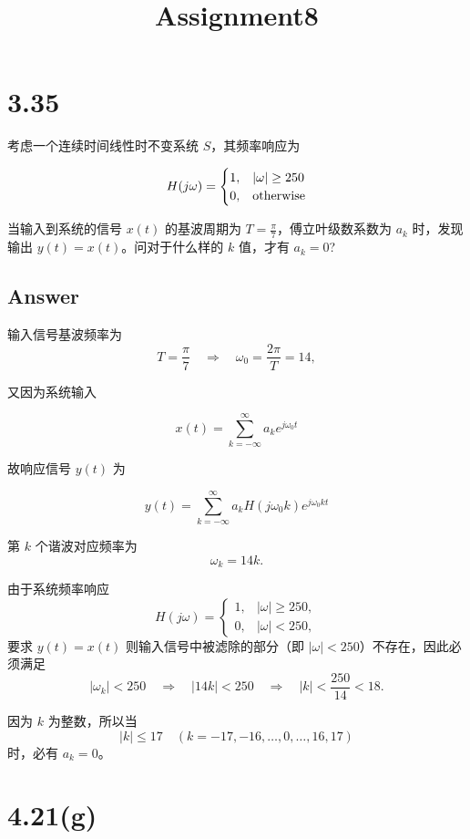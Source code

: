 \documentclass[11pt]{article}
\title{Assignment8}
\begin{document}
    
    \maketitle
    
    

    
    \section{3.35}\label{section}

考虑一个连续时间线性时不变系统 \(S\)，其频率响应为

\[
H(j\omega) = \begin{cases}
1, & |\omega| \ge 250 \\
0, & \rm otherwise
\end{cases}
\]

当输入到系统的信号 \(x(t)\) 的基波周期为 \(T = \frac{\pi}{7}
\)，傅立叶级数系数为 \(a_k\) 时，发现输出
\(y(t) = x(t)\)。问对于什么样的 \(k\) 值，才有 \(a_k = 0\)?

\subsection{Answer}\label{answer}

输入信号基波频率为 \[
T=\frac{\pi}{7}\quad\Rightarrow\quad \omega_0=\frac{2\pi}{T}=14,
\]

又因为系统输入

\[
x(t) = \sum_{k = -\infty}^{\infty}a_ke^{j\omega_0t}
\]

故响应信号 \(y(t)\) 为

\[
y(t) = \sum_{k = -\infty}^{\infty} a_kH(j\omega_0k) e^{j\omega_0kt}
\]

第 \(k\) 个谐波对应频率为 \[
\omega_k=14k.
\]

由于系统频率响应 \[
H(j\omega)=
\begin{cases}
1, & |\omega|\ge 250,\\[1mm]
0, & |\omega|<250,
\end{cases}
\] 要求 \(y(t)=x(t)\) 则输入信号中被滤除的部分（即
\(|\omega|<250\)）不存在，因此必须满足 \[
|\omega_k|<250\quad\Rightarrow\quad |14k|<250\quad\Rightarrow\quad |k|<\frac{250}{14}< 18.
\]

因为 \(k\) 为整数，所以当 \[
|k|\le 17\quad (k=-17,-16,\ldots,0,\ldots,16,17)
\] 时，必有 \(a_k=0\)。

    \section{4.21(g)}\label{g}
\end{document}
